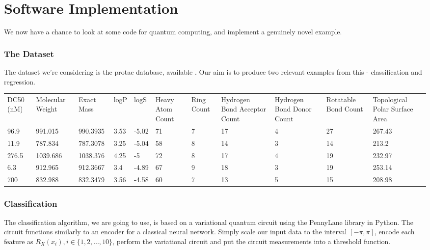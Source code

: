 \documentclass{article}
\theoremstyle{definition}
\begin{document}
\clearpage
\part{Software Implementation}
We now have a chance to look at some code for quantum computing, and implement a genuinely novel example.
\section{The Dataset}
The dataset we're considering is the protac database, available \cite{10.1093/nar/gkaa807}. Our aim is to produce two relevant examples from this - classification and regression. 

\begin{table}[htb]
\begin{tabular}[scale=0.5]{lllllllllll}
DC50 (nM) & Molecular Weight & Exact Mass & logP & logS  & Heavy Atom Count & Ring Count & Hydrogen Bond Acceptor Count & Hydrogen Bond Donor Count & Rotatable Bond Count & Topological Polar Surface Area \\
96.9      & 991.015          & 990.3935   & 3.53 & -5.02 & 71               & 7          & 17                           & 4                         & 27                   & 267.43                         \\
11.9      & 787.834          & 787.3078   & 3.25 & -5.04 & 58               & 8          & 14                           & 3                         & 14                   & 213.2                          \\
276.5     & 1039.686         & 1038.376   & 4.25 & -5    & 72               & 8          & 17                           & 4                         & 19                   & 232.97                         \\
6.3       & 912.965          & 912.3667   & 3.4  & -4.89 & 67               & 9          & 18                           & 3                         & 19                   & 253.14                         \\
700       & 832.988          & 832.3479   & 3.56 & -4.58 & 60               & 7          & 13                           & 5                         & 15                   & 208.98                        
\end{tabular}
\end{table}

\section{Classification}
The classification algorithm, we are going to use, is based on a variational quantum circuit using the PennyLane library \cite{bergholm2020pennylane} in Python. The circuit functions similarly to an encoder for a classical neural network. Simply scale our input data to the interval $[-\pi, \pi]$, encode each feature as $R_X(x_i), i \in \{1, 2, \ldots, 10\}$, perform the variational circuit and put the circuit measurements into a threshold function.
\end{document}
